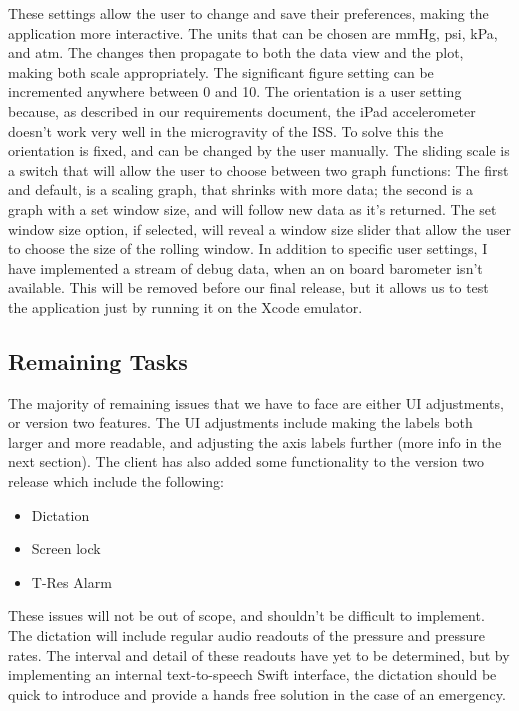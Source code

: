 \documentclass[onecolumn, draftclsnofoot,10pt, compsoc]{IEEEtran}
\begin{document}
These settings allow the user to change and save their preferences, making the application more interactive.
The units that can be chosen are mmHg, psi, kPa, and atm.
The changes then propagate to both the data view and the plot, making both scale appropriately.
The significant figure setting can be incremented anywhere between 0 and 10.
The orientation is a user setting because, as described in our requirements document, the iPad accelerometer doesn't work very well in the microgravity of the ISS.
To solve this the orientation is fixed, and can be changed by the user manually.
The sliding scale is a switch that will allow the user to choose between two graph functions: The first and default, is a scaling graph, that shrinks with more data; the second is a graph with a set window size, and will follow new data as it's returned.
The set window size option, if selected, will reveal a window size slider that allow the user to choose the size of the rolling window.
In addition to specific user settings, I have implemented a stream of debug data, when an on board barometer isn't available.
This will be removed before our final release, but it allows us to test the application just by running it on the Xcode emulator.

\subsection{Remaining Tasks}
The majority of remaining issues that we have to face are either UI adjustments, or version two features.
The UI adjustments include making the labels both larger and more readable, and adjusting the axis labels further (more info in the next section).
The client has also added some functionality to the version two release which include the following:

\begin{itemize}
  \item Dictation
  \item Screen lock
  \item T-Res Alarm
\end{itemize}

These issues will not be out of scope, and shouldn't be difficult to implement.
The dictation will include regular audio readouts of the pressure and pressure rates.
The interval and detail of these readouts have yet to be determined, but by implementing an internal text-to-speech Swift interface, the dictation should be quick to introduce and provide a hands free solution in the case of an emergency.
\end{document}
